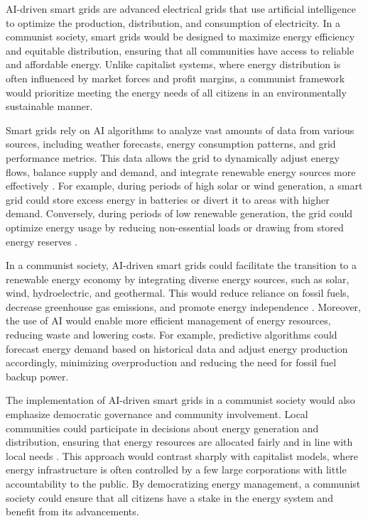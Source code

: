 AI-driven smart grids are advanced electrical grids that use artificial intelligence to optimize the production, distribution, and consumption of electricity. In a communist society, smart grids would be designed to maximize energy efficiency and equitable distribution, ensuring that all communities have access to reliable and affordable energy. Unlike capitalist systems, where energy distribution is often influenced by market forces and profit margins, a communist framework would prioritize meeting the energy needs of all citizens in an environmentally sustainable manner.

Smart grids rely on AI algorithms to analyze vast amounts of data from various sources, including weather forecasts, energy consumption patterns, and grid performance metrics. This data allows the grid to dynamically adjust energy flows, balance supply and demand, and integrate renewable energy sources more effectively \cite[pp.~45-52]{hoffman2012smart}. For example, during periods of high solar or wind generation, a smart grid could store excess energy in batteries or divert it to areas with higher demand. Conversely, during periods of low renewable generation, the grid could optimize energy usage by reducing non-essential loads or drawing from stored energy reserves \cite[pp.~89-95]{stoll2019ai}.

In a communist society, AI-driven smart grids could facilitate the transition to a renewable energy economy by integrating diverse energy sources, such as solar, wind, hydroelectric, and geothermal. This would reduce reliance on fossil fuels, decrease greenhouse gas emissions, and promote energy independence \cite[pp.~134-140]{kassakian2011smart}. Moreover, the use of AI would enable more efficient management of energy resources, reducing waste and lowering costs. For example, predictive algorithms could forecast energy demand based on historical data and adjust energy production accordingly, minimizing overproduction and reducing the need for fossil fuel backup power.

The implementation of AI-driven smart grids in a communist society would also emphasize democratic governance and community involvement. Local communities could participate in decisions about energy generation and distribution, ensuring that energy resources are allocated fairly and in line with local needs \cite[pp.~150-158]{johnson2018renewable}. This approach would contrast sharply with capitalist models, where energy infrastructure is often controlled by a few large corporations with little accountability to the public. By democratizing energy management, a communist society could ensure that all citizens have a stake in the energy system and benefit from its advancements.

